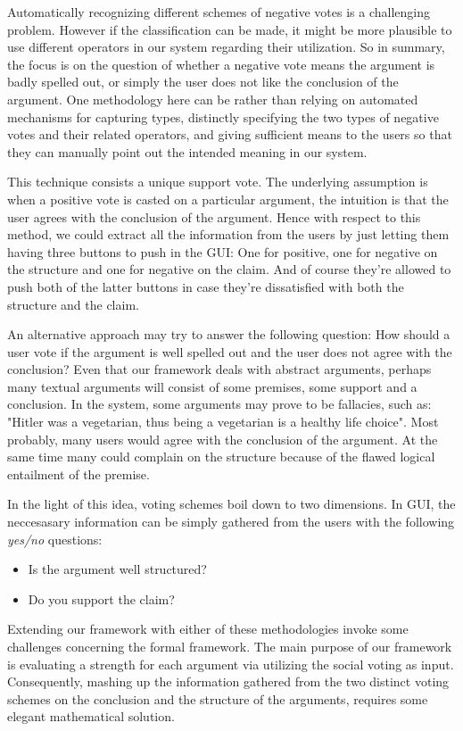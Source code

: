 \documentclass{article}
\begin{document}
Automatically recognizing different schemes of negative votes is a challenging problem. However if the classification can be made, it might be more plausible to use different operators in our system regarding their utilization. So in summary, the focus is on the question of whether a negative vote means the argument is badly spelled out, or simply the user does not like the conclusion of  the argument. One methodology here can be rather than relying on automated mechanisms for capturing types, distinctly specifying the two types of negative votes and their related operators, and giving sufficient means to the users so that they can manually point out the intended meaning in our system. 

This technique consists a unique support vote. The underlying assumption is when a positive vote is casted on a particular argument, the intuition is that the user agrees with the conclusion of the argument. Hence with respect to this method, we could extract all the information from the users by just letting them having three buttons to push in the GUI: One for positive, one for negative on the structure and one for negative on the claim. And of course they're allowed to push both of the latter buttons in case they're dissatisfied with both the structure and the claim.

An alternative approach may try to answer the following question: How should a user vote if the argument is well spelled out and the user does not agree with the conclusion? Even that our framework deals with abstract arguments, perhaps many textual arguments will consist of some premises, some support and a conclusion. In the system, some arguments may prove to be fallacies, such as: "Hitler was a vegetarian, thus being a vegetarian is a healthy life choice".  Most probably, many users would agree with the conclusion of the argument. At the same time many could complain on the structure because of the flawed logical entailment of  the premise.

In the light of this idea, voting schemes boil down to two dimensions. In GUI, the neccesasary information can be simply gathered from the users with the following \textit{yes/no} questions:
\begin {itemize}
\item Is the argument well structured?
\item Do you support the claim?
\end{itemize}


Extending our framework with either of these methodologies invoke some challenges concerning the formal framework. The main purpose of our framework is evaluating a strength for each argument via utilizing the social voting as input. Consequently, mashing up the information gathered from the two distinct voting schemes on the conclusion and the structure of the arguments, requires some elegant mathematical solution.
\end{document}
